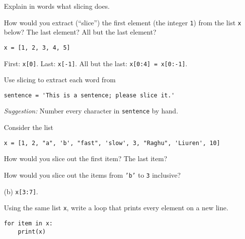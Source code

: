 \documentclass[11pt]{exam}
\begin{document}
\begin{questions}

\item Explain in words what slicing does.

\item How would you extract (``slice'') the first element (the integer {\tt 1}) from the list {\tt x} below?
The last element?  All but the last element?
\begin{verbatim}
x = [1, 2, 3, 4, 5]
\end{verbatim}

\begin{solution}
First:  {\tt x[0]}.  Last:  {\tt x[-1]}.  All but the last:  {\tt x[0:4] = x[0:-1]}.
\end{solution}


\item Use slicing to extract each word from
\begin{verbatim}
sentence = 'This is a sentence; please slice it.'
\end{verbatim}
{\it Suggestion:\/} Number every character in {\tt sentence} by hand.


\item Consider the list
\begin{verbatim}
x = [1, 2, "a", 'b', "fast", 'slow', 3, "Raghu", 'Liuren', 10]
\end{verbatim}
\begin{parts}
\item How would you slice out the first item?  The last item?
\item How would you slice out the items from {\tt 'b'} to {\tt 3} inclusive?
\end{parts}

\begin{solution}
(b) {\tt x[3:7]}.
\end{solution}

\item Using the same list {\tt x}, write a loop that prints every element on a new line.

\begin{solution}
\begin{verbatim}
for item in x:
    print(x)
\end{verbatim}
\end{solution}


\end{questions}
\end{document}
